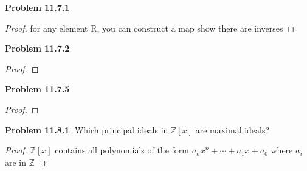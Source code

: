 \documentclass[12pt]{article}
\begin{document}
\textbf{Problem 11.7.1}
\begin{proof}
for any element R, you can construct a map
show there are inverses
\end{proof}

\textbf{Problem 11.7.2}
\begin{proof}

\end{proof}

\textbf{Problem 11.7.5}
\begin{proof}

\end{proof}

\textbf{Problem 11.8.1}: Which principal ideals in $\mathbb{Z}[x]$ are maximal ideals?
\begin{proof}
$\mathbb{Z}[x]$ contains all polynomials of the form $a_nx^n + \cdots + a_1x + a_0$ where $a_i$ are in $\mathbb{Z}$
\end{proof}
\end{document}
